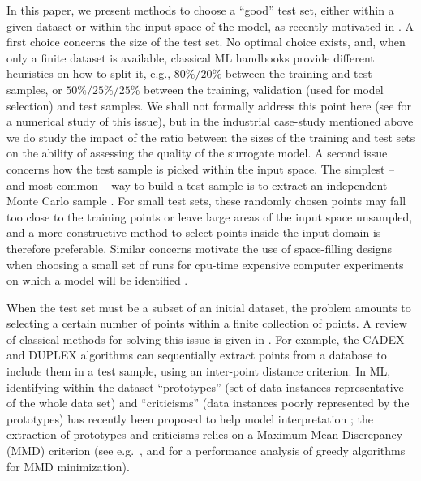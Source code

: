 In this paper, we present methods to choose a ``good'' test set, either within a given dataset or within the input space of the model, as recently motivated in \cite{ioo21,josvak21}. 
A first choice  concerns the size of the test set. No optimal choice exists, and, when only a finite dataset is available, classical ML handbooks \cite{hastib09,gooben16} provide different heuristics on how to split it, e.g., $80\% / 20\%$ between the training and test samples, or $50\% / 25\% / 25\%$ between the training, validation (used for model selection) and test samples. 
We shall not formally address this point here (see \cite{xugoo18} for a numerical study of this issue), but in the industrial case-study mentioned above we do study the impact of the ratio between the sizes of the training and test sets on the ability of assessing the quality of the surrogate model. 
A second issue concerns how the test sample is picked within the input space. The simplest -- and most common -- way to build a test sample is to extract an independent Monte Carlo sample \cite{hastib09}. 
For small test sets, these randomly chosen points may fall too close to the training points or leave large areas of the input space unsampled, and a more constructive method to select points inside the input domain is therefore preferable. 
Similar concerns motivate the use of space-filling designs when choosing a small set of runs for cpu-time expensive computer experiments on which a model will be identified \cite{fanli06,promul12}. 

When the test set must be a subset of an initial dataset, the problem amounts to selecting a certain number of points within a finite collection of points. 
A review of classical methods for solving this issue is given in \cite{borjir12}. 
For example, the CADEX and DUPLEX algorithms \cite{kensto69,sne77} can sequentially extract points from a database to include them in a test sample, using an inter-point distance criterion. 
In ML, identifying within the dataset ``prototypes'' (set of data instances representative of the whole data set) and ``criticisms'' (data instances poorly represented by the prototypes) has recently been proposed to help model interpretation \cite{mol19}; 
the extraction of prototypes and criticisms relies on a Maximum Mean Discrepancy (MMD) criterion \cite{smogre07} (see e.g.\ \cite{prozhi20}, and \cite{pro21} for a performance analysis of greedy algorithms for MMD minimization). 

